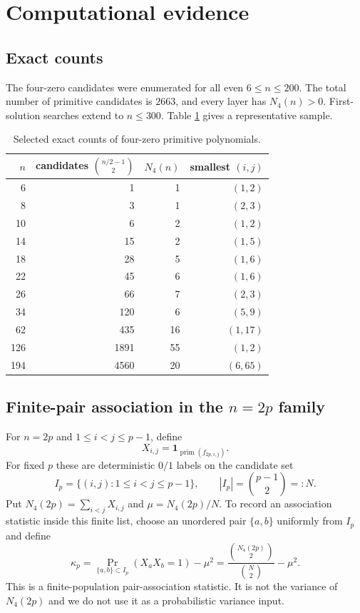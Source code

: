 \documentclass[11pt]{article}
\theoremstyle{definition}
\theoremstyle{remark}
\begin{document}
\section{Computational evidence}
\label{sec:computations}

\subsection{Exact counts}

The four-zero candidates were enumerated for all even $6\le n\le 200$. The total number of primitive candidates is $2663$, and every layer has $N_4(n)>0$. First-solution searches extend to $n\le 300$. Table \ref{tab:counts} gives a representative sample.

\begin{table}[ht]
\centering
\small
\begin{tabular}{rrrr}
\toprule
$n$ & candidates $\binom{n/2-1}{2}$ & $N_4(n)$ & smallest $(i,j)$\\
\midrule
6 & 1 & 1 & $(1,2)$\\
8 & 3 & 1 & $(2,3)$\\
10 & 6 & 2 & $(1,2)$\\
14 & 15 & 2 & $(1,5)$\\
18 & 28 & 5 & $(1,6)$\\
22 & 45 & 6 & $(1,6)$\\
26 & 66 & 7 & $(2,3)$\\
34 & 120 & 6 & $(5,9)$\\
62 & 435 & 16 & $(1,17)$\\
126 & 1891 & 55 & $(1,2)$\\
194 & 4560 & 20 & $(6,65)$\\
\bottomrule
\end{tabular}
\caption{Selected exact counts of four-zero primitive polynomials.}
\label{tab:counts}
\end{table}

\subsection{Finite-pair association in the \texorpdfstring{$n=2p$}{n=2p} family}

For $n=2p$ and $1\le i<j\le p-1$, define
\[
X_{i,j}=\mathbf 1_{\operatorname{prim}(f_{2p,i,j})}.
\]
For fixed $p$ these are deterministic $0/1$ labels on the candidate set
\[
I_p=\{(i,j):1\le i<j\le p-1\},\qquad |I_p|=\binom{p-1}{2}=:N.
\]
Put $N_4(2p)=\sum_{i<j}X_{i,j}$ and $\mu=N_4(2p)/N$. To record an
association statistic inside this finite list, choose an unordered pair
$\{a,b\}$ uniformly from $I_p$ and define
\begin{equation}\label{eq:kappa}
\kappa_p=
\Pr_{\{a,b\}\subset I_p}(X_aX_b=1)-\mu^2
=
\frac{\binom{N_4(2p)}{2}}{\binom N2}-\mu^2.
\end{equation}
This is a finite-population pair-association statistic. It is not the
variance of $N_4(2p)$ and we do not use it as a probabilistic variance input.
\end{document}
